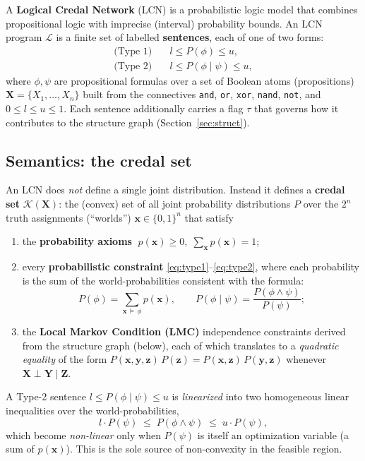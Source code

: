 \documentclass[11pt]{article}
\newcommand{\cK}{\mathcal{K}}
\newcommand{\cL}{\mathcal{L}}
\newcommand{\bX}{\mathbf{X}}
\newcommand{\bY}{\mathbf{Y}}
\newcommand{\bZ}{\mathbf{Z}}
\newcommand{\bx}{\mathbf{x}}
\begin{document}
A \textbf{Logical Credal Network} (LCN) is a probabilistic logic model that
combines propositional logic with imprecise (interval) probability bounds.
An LCN program $\cL$ is a finite set of labelled \textbf{sentences}, each of
one of two forms:
\begin{align}
  \text{(Type 1)}\quad & l \le P(\phi) \le u, \label{eq:type1}\\
  \text{(Type 2)}\quad & l \le P(\phi \mid \psi) \le u, \label{eq:type2}
\end{align}
where $\phi,\psi$ are propositional formulas over a set of Boolean atoms
(propositions) $\bX = \{X_1,\dots,X_n\}$ built from the connectives
\texttt{and}, \texttt{or}, \texttt{xor}, \texttt{nand}, \texttt{not}, and
$0\le l \le u \le 1$. Each sentence additionally carries a flag $\tau$ that
governs how it contributes to the structure graph (Section~\ref{sec:struct}).

\subsection{Semantics: the credal set}

An LCN does \emph{not} define a single joint distribution. Instead it defines
a \textbf{credal set} $\cK(\bX)$: the (convex) set of all joint probability
distributions $P$ over the $2^n$ truth assignments (``worlds'')
$\bx \in \{0,1\}^n$ that satisfy
\begin{enumerate}
  \item the \textbf{probability axioms}
        $\;p(\bx)\ge 0,\; \sum_{\bx} p(\bx) = 1$;
  \item every \textbf{probabilistic constraint} \eqref{eq:type1}--\eqref{eq:type2},
        where each probability is the sum of the world-probabilities consistent
        with the formula:
        \[
          P(\phi) = \sum_{\bx \,\models\, \phi} p(\bx), \qquad
          P(\phi\mid\psi) = \frac{P(\phi\wedge\psi)}{P(\psi)};
        \]
  \item the \textbf{Local Markov Condition (LMC)} independence constraints
        derived from the structure graph (below), each of which translates to a
        \emph{quadratic equality} of the form
        $P(\mathbf{x},\mathbf{y},\mathbf{z})\,P(\mathbf{z}) =
         P(\mathbf{x},\mathbf{z})\,P(\mathbf{y},\mathbf{z})$
        whenever $\bX\!\perp\!\bY \mid \bZ$.
\end{enumerate}
A Type-2 sentence $l \le P(\phi\mid\psi)\le u$ is \emph{linearized} into two
homogeneous linear inequalities over the world-probabilities,
\begin{equation}\label{eq:lin}
  l \cdot P(\psi) \;\le\; P(\phi\wedge\psi) \;\le\; u\cdot P(\psi),
\end{equation}
which become \emph{non-linear} only when $P(\psi)$ is itself an optimization
variable (a sum of $p(\bx)$). This is the sole source of non-convexity in the
feasible region.
\end{document}
